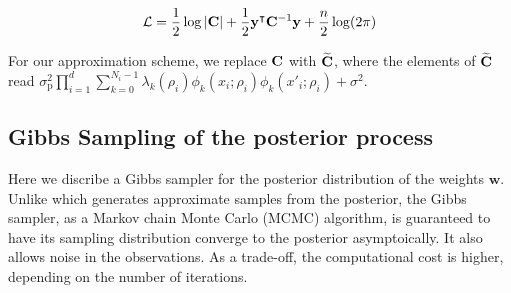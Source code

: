 \documentclass{article}
\begin{document}
\begin{equation}\label{}
	\mathcal{L} = \frac{1}{2} \log |{\bf C}| + \frac{1}{2} {\bf y}^\intercal {\bf C}^{-1} {\bf y} +\frac{n}{2} \log(2 \pi) 
\end{equation}

For our approximation scheme, we replace ${\bf C}$ with $\widetilde{\bf C}$, where the elements of $\widetilde{\bf C}$ read $\sigma^2_\text{p} \prod_{i=1}^{d} \sum_{k=0}^{N_i-1} \lambda_k (\rho_i) \phi_k(x_i;\rho_i) \phi_k(x'_i;\rho_i) + \sigma^2$.

%


\subsection{Gibbs Sampling of the posterior process}
\label{sec:Gibbs}

Here we discribe a Gibbs sampler for the posterior distribution of the weights $\mathbf{w}$.
Unlike  which generates approximate samples from the posterior,
the Gibbs sampler, as a Markov chain Monte Carlo (MCMC) algorithm,
is guaranteed to have its sampling distribution converge to the posterior asymptoically.
It also allows noise in the observations.
As a trade-off, the computational cost is higher, depending on the number of iterations.
\end{document}
